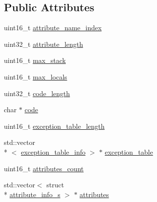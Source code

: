 \subsection*{Public Attributes}
\begin{DoxyCompactItemize}
\item 
uint16\+\_\+t \hyperlink{structCode__attribute__s_a2ad36c662b25c88553dffda3499b304a}{attribute\+\_\+name\+\_\+index}
\item 
uint32\+\_\+t \hyperlink{structCode__attribute__s_a83fe4677e5b3b8a9fb6460b064148ac3}{attribute\+\_\+length}
\item 
uint16\+\_\+t \hyperlink{structCode__attribute__s_a9f7cd4c713b350f6630949c6364e8e48}{max\+\_\+stack}
\item 
uint16\+\_\+t \hyperlink{structCode__attribute__s_a1c9257d634d9e8473acf1a3d13fac4e7}{max\+\_\+locals}
\item 
uint32\+\_\+t \hyperlink{structCode__attribute__s_ad5cdbcaf02efd1ac9d75d1d1d73d7523}{code\+\_\+length}
\item 
char $\ast$ \hyperlink{structCode__attribute__s_a6c555b4affb696853a72ee0df0af3864}{code}
\item 
uint16\+\_\+t \hyperlink{structCode__attribute__s_a73c51a112c0f08db03fe7622279b01e5}{exception\+\_\+table\+\_\+length}
\item 
std\+::vector\\*
$<$ \hyperlink{classexception__table__info}{exception\+\_\+table\+\_\+info} $>$ $\ast$ \hyperlink{structCode__attribute__s_a64c20d58846e4b1af5c4de2a750e8fde}{exception\+\_\+table}
\item 
uint16\+\_\+t \hyperlink{structCode__attribute__s_a12d5860b06a8484744852c38cb79144e}{attributes\+\_\+count}
\item 
std\+::vector$<$ struct \\*
\hyperlink{structattribute__info__s}{attribute\+\_\+info\+\_\+s} $>$ $\ast$ \hyperlink{structCode__attribute__s_a04152c5c6f9f1067d6e144e1e3a814fe}{attributes}
\end{DoxyCompactItemize}



